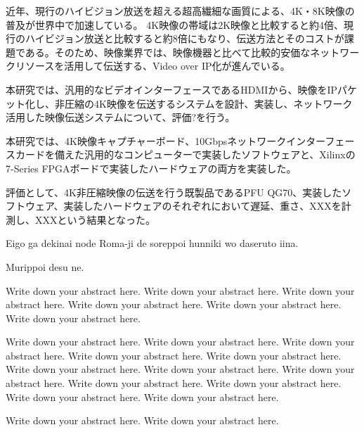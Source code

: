 
\begin{jabstract}

近年、現行のハイビジョン放送を超える超高繊細な画質による、4K・8K映像の普及が世界中で加速している。
4K映像の帯域は2K映像と比較すると約4倍、現行のハイビジョン放送と比較すると約8倍にもなり、伝送方法とそのコストが課題である。そのため、映像業界では、映像機器と比べて比較的安価なネットワークリソースを活用して伝送する、Video over IP化が進んでいる。

本研究では、汎用的なビデオインターフェースであるHDMIから、映像をIPパケット化し、非圧縮の4K映像を伝送するシステムを設計、実装し、ネットワーク活用した映像伝送システムについて、評価?を行う。%

本研究では、4K映像キャプチャーボード、10Gbpsネットワークインターフェースカードを備えた汎用的なコンピューターで実装したソフトウェアと、Xilinxの7-Series FPGAボードで実装したハードウェアの両方を実装した。

評価として、4K非圧縮映像の伝送を行う既製品であるPFU QG70、実装したソフトウェア、実装したハードウェアのそれぞれにおいて遅延、重さ、XXXを計測し、XXXという結果となった。

\end{jabstract}


\begin{eabstract}

Eigo ga dekinai node Roma-ji de soreppoi hunniki wo daseruto iina.

Murippoi desu ne.

Write down your abstract here. Write down your abstract here. Write down your abstract here. Write down your abstract here. Write down your abstract here. Write down your abstract here.

 Write down your abstract here. Write down your abstract here. Write down your abstract here. Write down your abstract here. Write down your abstract here. Write down your abstract here. Write down your abstract here. Write down your abstract here. Write down your abstract here. Write down your abstract here. Write down your abstract here. Write down your abstract here.

Write down your abstract here. Write down your abstract here.

\end{eabstract}

